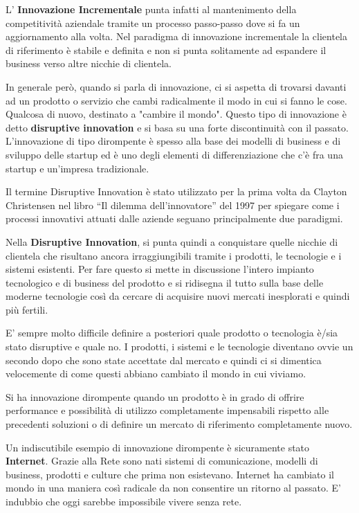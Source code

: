 L' \textbf{Innovazione Incrementale} punta infatti al mantenimento della competitività aziendale tramite un processo passo-passo dove si fa un aggiornamento alla volta. Nel paradigma di innovazione incrementale la clientela di riferimento è stabile e definita e non si punta solitamente ad espandere il business verso altre nicchie di clientela.

In generale però, quando si parla di innovazione, ci si aspetta di trovarsi davanti ad un prodotto o servizio che cambi radicalmente il modo in cui si fanno le cose. Qualcosa di nuovo, destinato a "cambire il mondo". Questo tipo di innovazione è detto \textbf{disruptive innovation} e si basa su una forte discontinuità con il passato. L'innovazione di tipo dirompente è spesso alla base dei modelli di business e di sviluppo delle startup ed è uno degli elementi di differenziazione che c'è fra una startup e un'impresa tradizionale.

Il termine Disruptive Innovation è stato utilizzato per la prima volta da Clayton Christensen nel libro ``Il dilemma dell’innovatore'' del 1997 per spiegare come i processi innovativi attuati dalle aziende seguano principalmente due paradigmi.

Nella \textbf{Disruptive Innovation}, si punta quindi a conquistare quelle nicchie di clientela che risultano ancora irraggiungibili tramite i prodotti, le tecnologie e i sistemi esistenti. Per fare questo si mette in discussione l'intero impianto tecnologico e di business del prodotto e si ridisegna il tutto sulla base delle moderne tecnologie così da cercare di acquisire nuovi mercati inesplorati e quindi più fertili.

E' sempre molto difficile definire a posteriori quale prodotto o tecnologia è/sia stato disruptive e quale no. I prodotti, i sistemi e le tecnologie diventano ovvie un secondo dopo che sono state accettate dal mercato e quindi ci si dimentica velocemente di come questi abbiano cambiato il mondo in cui viviamo. 

Si ha innovazione dirompente quando un prodotto è in grado di offrire performance e possibilità di utilizzo completamente impensabili rispetto alle precedenti soluzioni o di definire un mercato di riferimento completamente nuovo.

Un indiscutibile esempio di innovazione dirompente è sicuramente stato \textbf{Internet}. Grazie alla Rete sono nati sistemi di comunicazione, modelli di business, prodotti e culture che prima non esistevano. Internet ha cambiato il mondo in una maniera così radicale da non consentire un ritorno al passato. E' indubbio che oggi sarebbe impossibile vivere senza rete.

